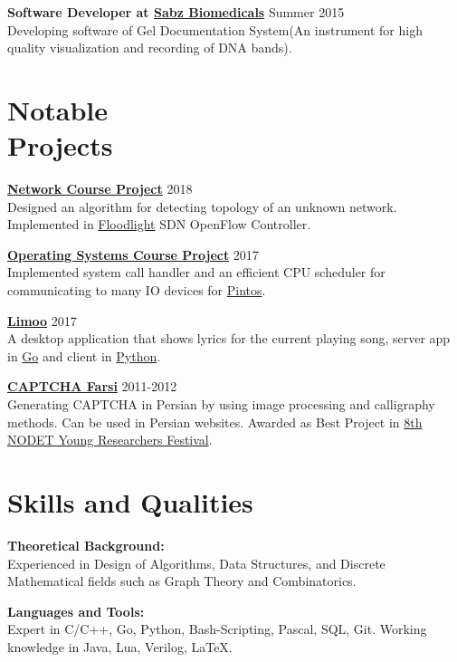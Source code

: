 \documentclass[margin]{res}
\begin{document}
\begin{resume}
	{\bf Software Developer at \href{http://www.sabzgroup.com/}{Sabz Biomedicals}} \hfill Summer 2015
	\\Developing software of Gel Documentation System(An instrument for  high quality visualization and recording of DNA bands).

\section{Notable \\ Projects}
	{\bf \href{https://github.com/shayanh/floodlight-sara-protocol}{Network Course Project}} \hfill 2018
	\\Designed an algorithm for detecting topology of an unknown network. Implemented in \href{https://github.com/floodlight/floodlight}{Floodlight} SDN OpenFlow Controller.

	{\bf \href{https://github.com/shayanh/pintos}{Operating Systems Course Project}} \hfill 2017
	\\Implemented system call handler and an efficient CPU scheduler for communicating to many IO devices for \href{https://en.wikipedia.org/wiki/Pintos}{Pintos}.
	
	{\bf \href{https://github.com/shayanh/limoo}{Limoo}} \hfill 2017
	\\A desktop application that shows lyrics for the current playing song, server app in \href{https://github.com/shayanh/limoo-server}{Go} and client in \href{https://github.com/shayanh/limoo}{Python}.
	
	{\bf \href{https://github.com/KhassTeam/Persian-CAPTCHA}{CAPTCHA Farsi}} \hfill 2011-2012
	\\Generating CAPTCHA in Persian by using image processing and calligraphy methods. Can be used in Persian websites. Awarded as Best Project in
	\href{https://www.helli.ir/portal/content/%D8%AA%D9%82%D8%AF%DB%8C%D8%B1-%D8%A7%D8%B2-%D8%AF%D8%A7%D9%86%D8%B4-%D8%A2%D9%85%D9%88%D8%B2%D8%A7%D9%86-%D8%A8%D8%B1%D8%AA%D8%B1%D9%BE%DA%98%D9%88%D9%87%D8%B4%DA%AF%D8%B1}
	{8th NODET Young Researchers Festival}.

\section{Skills and Qualities} 
    {\bf Theoretical Background:}
    \\Experienced in Design of Algorithms, Data Structures, and Discrete Mathematical fields such as Graph Theory and Combinatorics.

	{\bf Languages and Tools:}
	\\Expert in C/C++, Go, Python, Bash-Scripting, Pascal, SQL, Git. Working knowledge in Java, Lua, Verilog, \LaTeX.


\end{resume}
\end{document}
